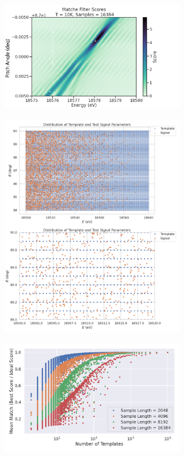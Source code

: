 \begin{figure}[htbp]
    \centering
    \includegraphics*[width=0.7\textwidth]{figs/Chapter-4/230725_example_mf_score_map.png}
    \caption{}
\end{figure}

\begin{figure}[htbp]
    \centering
    \includegraphics*[width=0.7\textwidth]{figs/Chapter-4/230725_matched_filter_grid_example.png}
    \caption{}
\end{figure}

\begin{figure}[htbp]
    \centering
    \includegraphics*[width=0.7\textwidth]{figs/Chapter-4/220114_mean_match_vs_number_of_templates_87.0_0cm_modify_sample_number.png}
    \caption{}
\end{figure}

